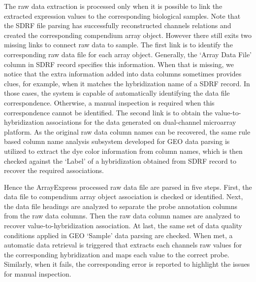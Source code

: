 The raw data extraction is processed only when it is possible to link the
extracted expression values to the corresponding biological samples.
%
Note that the SDRF file parsing has successfully reconstructed channels
relations and created the corresponding compendium array object.
%
However there still exits two missing links to connect raw data to sample.
%
The first link is to identify the corresponding raw data file for each array
object.  Generally, the `Array Data File' column in SDRF record specifies
this information.
%
When that is missing, we notice that the extra information added into
data columns sometimes provides clues, for example, when it matches the
hybridization name of a SDRF record.
%
In those cases, the system is capable of automatically identifying the data
file correspondence.
%
Otherwise, a manual inspection is required when this correspondence cannot be
identified.
%
The second link is to obtain the value-to-hybridization associations for the
data generated on dual-channel microarray platform.
%
As the original raw data column names can be recovered, the same rule based
column name analysis subsystem developed for GEO data parsing is utilized to
extract the dye color information from column names, which is then checked
against the `Label' of a hybridization obtained from SDRF record to recover
the required associations.

Hence the ArrayExpress processed raw data file are parsed in five steps.
%
First, the data file to compendium array object association is checked or
identified.  Next, the data file headings are analyzed to separate the probe
annotation columns from the raw data columns.  Then the raw data column names
are analyzed to recover value-to-hybridization association.  At last, the same
set of data quality conditions applied in GEO `Sample' data parsing are
checked.  When met, a automatic data retrieval is triggered that extracts
each channels raw values for the corresponding hybridization and maps each
value to the correct probe.
%
Similarly, when it fails, the corresponding error is reported to highlight the
issues for manual inspection.




